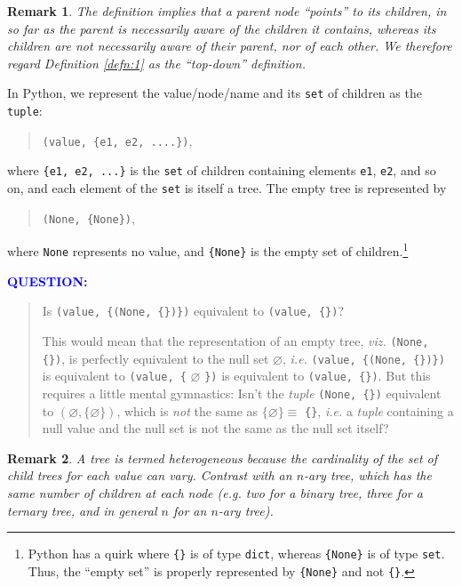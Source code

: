\documentclass[10pt]{amsart}
\numberwithin{equation}{section}
\newtheorem{remark}{Remark}[section]
\begin{document}
\begin{remark}
The definition implies that a parent node ``points'' to its children, in so far
as the parent is necessarily aware of the children it contains, whereas its
children are not necessarily aware of their parent, nor of each other.  
We therefore regard Definition \ref{defn:1} as the ``top-down'' definition.
\end{remark}

In Python, we represent the value/node/name and its \texttt{set} of children as the 
\texttt{tuple}: 
\begin{quote}
\texttt{(value, \{e1, e2, ....\})},
\end{quote}
where \texttt{\{e1, e2, ...\}} is the \texttt{set} of children containing elements 
\texttt{e1}, \texttt{e2}, and so on, and each element of the \texttt{set} is itself a tree.  
The empty tree is represented by
\begin{quote}
\texttt{(None, \{None\})},
\end{quote}
where \texttt{None} represents no value, and \texttt{\{None\}} is the empty set of children.\footnote{Python has a quirk where \texttt{\{\}} is of type \texttt{dict}, whereas \texttt{\{None\}} is of type \texttt{set}. Thus, the ``empty set'' is properly represented by \texttt{\{None\}} and not \texttt{\{\}}.} 

\textcolor{blue}{\bf QUESTION:}
\begin{quote}
Is \texttt{(value, \{(None, \{\})\})} equivalent to \texttt{(value, \{\})}?

This would mean that the representation of an empty tree, \emph{viz.} \texttt{(None, \{\})},
is perfectly equivalent to the null set
$\varnothing$,
\emph{i.e.}
\texttt{(value, \{(None, \{\})\})} is equivalent to 
\texttt{(value, \{}
$\varnothing$
\texttt{\})}
is equivalent to 
\texttt{(value, \{\})}.
But this requires a little mental gymnastics: Isn't the \emph{tuple} 
\texttt{(None, \{\})} equivalent to 
$(\varnothing, \{\varnothing\})$,
which is \emph{not} the same as 
$\{\varnothing\} \equiv$
\texttt{\{\}}, \emph{i.e.} a \emph{tuple} containing a null value and the null set
is not the same as the null set itself?
\end{quote}

\begin{remark}
A tree is termed \emph{heterogeneous\/} because the cardinality of the set of child trees
for each value can vary. Contrast with an $n$-ary tree, which has the same number of
children at each node (\emph{e.g.\/} two for a binary tree, three for a ternary tree, and in
general $n$ for an $n$-ary tree).
\end{remark}
\end{document}
